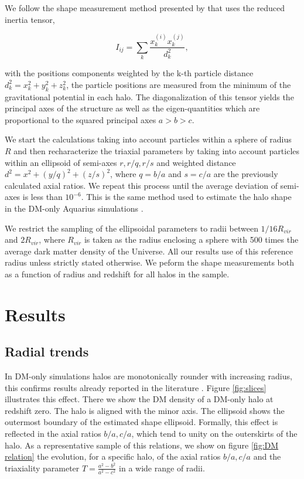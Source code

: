 \documentclass[a4paper,fleqn,usenatbib]{mnras}
\begin{document}
We follow the shape measurement method presented by
\cite{Allgood_et_al._2006} that uses the reduced
inertia tensor,     

\begin{equation}
I_{ij} = \sum_k \frac{x_k^{(i)}x_k^{(j)}}{d^2_k},
\label{eq:inertia}
\end{equation}

with the positions components weighted by the k-th particle distance
$d_k^2=x_k^2+y_k^2+z_k^2$, the particle positions are measured from
the minimum of the gravitational potential in each halo.
The diagonalization of this tensor yields the principal axes of the
structure as well as the eigen-quantities which are proportional to
the squared principal axes $a>b>c$. 

We start the calculations taking into account particles within a
sphere of radius $R$ and then  recharacterize the triaxial parameters by taking into account
particles within an ellipsoid of semi-axes $r,r/q,r/s$ and weighted
distance $d^2=x^2+(y/q)^2+(z/s)^2$, where $q = b/a$ and $s=c/a$
are the previously calculated axial ratios. 
We repeat this process until the average deviation of semi-axes is
less than $10^{-6}$.  
This is the same method used to estimate the halo shape in the DM-only
Aquarius simulations \citep{Vera-Ciro_et_al._2011}. 

We restrict the sampling of the ellipsoidal parameters to radii
between $1/16 R_{vir}$ and $2R_{vir}$, where  $R_{vir}$ is taken as the
radius enclosing a sphere with 500 times the average dark matter
density of the Universe. All our results use of this reference radius
unless strictly stated otherwise. 
We peform the shape measurements both as a function of radius and
redshift for all halos in the sample.


\section{Results}

\subsection{Radial trends}


In DM-only simulations halos are monotonically rounder with increasing
radius, this confirms results already reported in the literature
\citep{Vera-Ciro_et_al._2011}. 
Figure \ref{fig:slices} illustrates this effect.
There we show the DM density of a DM-only halo at redshift zero.
The halo is aligned with the minor axis. 
The ellipsoid shows the outermost boundary of the estimated shape ellipsoid.
Formally, this effect is reflected in the axial ratios $b/a,c/a$, which tend to unity
on the outerskirts of the halo. As a representative sample of this
relations, we show on figure \ref{fig:DM relation} the evolution, for
a specific halo, of the axial ratios $b/a,c/a$ and the triaxiality
parameter $T=\frac{a^2-b^2}{a^2-c^2}$ in a wide range of radii. 
\end{document}
